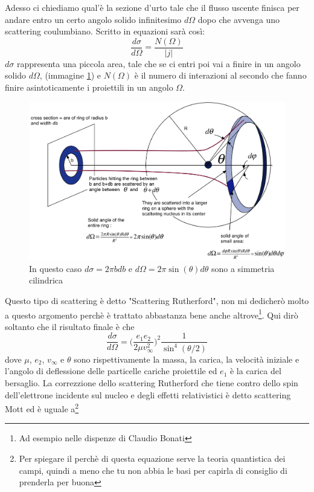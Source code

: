 \documentclass[11pt,a4paper]{report}
\begin{document}
		Adesso ci chiediamo qual'è la sezione d'urto tale che il flusso uscente finisca per andare entro un certo angolo solido infinitesimo $d\Omega$ dopo che avvenga uno scattering coulumbiano. Scritto in equazioni sarà così:
		\begin{equation}
			\frac{d\sigma}{d\Omega}=\frac{N(\Omega)}{|j|}
			\label{eq:sez_diff}
		\end{equation}
		$d\sigma$ rappresenta una piccola area, tale che se ci entri poi vai a finire in un angolo solido $d\Omega$, (immagine \ref{fig:rut1}) e $N(\Omega)$ è il numero di interazioni al secondo che fanno finire asintoticamente i proiettili in un angolo $\Omega$.\newline
		\begin{figure}
			\centering
    		\includegraphics[width=\linewidth]{Immagini/solid_angle.png}
    		\caption{In questo caso $d\sigma=2\pi b db$ e $d\Omega=2\pi \sin(\theta)d\theta$ sono a simmetria cilindrica}
    		\label{fig:rut1}
		\end{figure}
		Questo tipo di scattering è detto "Scattering Rutherford", non mi dedicherò molto a questo argomento perchè è trattato abbastanza bene anche altrove\footnote{Ad esempio nelle dispenze di Claudio Bonati}. Qui dirò soltanto che il risultato finale è che
		\begin{equation}
			\frac{d\sigma}{d\Omega}=\Big(\frac{e_1e_2}{2\mu v_\infty^2 }\Big)^2\frac{1}{\sin^4(\theta/2)}
		\end{equation}
		dove $\mu$, $e_2$, $v_\infty$ e $\theta$ sono rispettivamente la massa, la carica, la velocità iniziale e l'angolo di deflessione delle particelle cariche proiettile ed $e_1$ è la carica del bersaglio.\newline
		La correzzione dello scattering Rutherford che tiene contro dello spin dell'elettrone incidente sul nucleo e degli effetti relativistici è detto scattering Mott ed è uguale a\footnote{Per spiegare il perchè di questa equazione serve la teoria quantistica dei campi, quindi a meno che tu non abbia le basi per capirla di consiglio di prenderla per buona}
\end{document}
